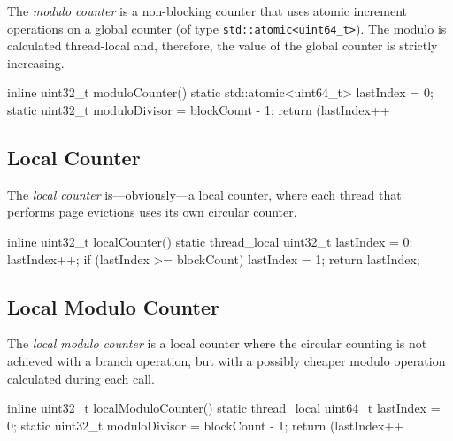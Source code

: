     The \emph{modulo counter} is a non-blocking counter that uses atomic increment operations on a global counter (of type \lstinline{std::atomic<uint64_t>}). The modulo is calculated thread-local and, therefore, the value of the global counter is strictly increasing.

\begin{@empty}
    \lstset{
        language = [ISO]C++
    }
\begin{centeredshadowboxlisting}
inline uint32_t moduloCounter() {
    static std::atomic<uint64_t> lastIndex = 0;
    static uint32_t moduloDivisor = blockCount
                                  - 1;
    return (lastIndex++ %
}
\end{centeredshadowboxlisting}
\end{@empty}

\subsection[Local Counter]{Local Counter} \label{subsec:local_counter}

    The \emph{local counter} is---obviously---a local counter, where each thread that performs page evictions uses its own circular counter.

\begin{@empty}
    \lstset{
        language = [ISO]C++
    }
\begin{centeredshadowboxlisting}
inline uint32_t localCounter() {
    static thread_local uint32_t lastIndex = 0;
    lastIndex++;
    if (lastIndex >= blockCount) {
        lastIndex = 1;
    }
    return lastIndex;
}
\end{centeredshadowboxlisting}
\end{@empty}

\subsection[Local Modulo Counter]{Local Modulo Counter} \label{subsec:local_modulo_counter}

    The \emph{local modulo counter} is a local counter where the circular counting is not achieved with a branch operation, but with a possibly cheaper modulo operation calculated during each call.

\begin{@empty}
    \lstset{
        language = [ISO]C++
    }
\begin{centeredshadowboxlisting}
inline uint32_t localModuloCounter() {
    static thread_local uint64_t lastIndex = 0;
    static uint32_t moduloDivisor = blockCount
                                  - 1;
    return (lastIndex++ %
}
\end{centeredshadowboxlisting}
\end{@empty}

